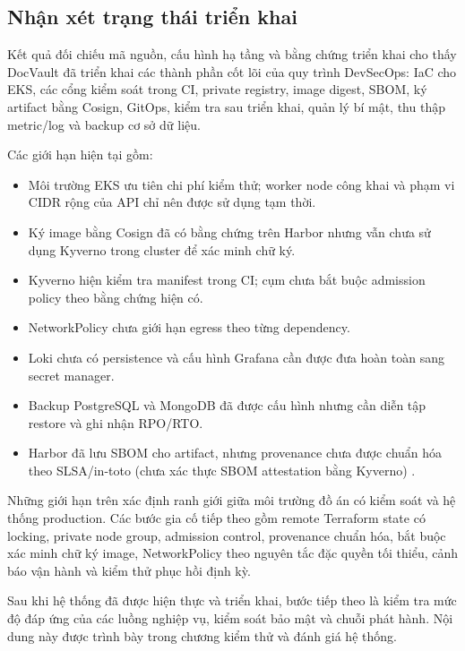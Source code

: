 \subsection{Nhận xét trạng thái triển khai}

Kết quả đối chiếu mã nguồn, cấu hình hạ tầng và bằng chứng triển khai cho thấy DocVault đã triển khai các thành phần cốt lõi của quy trình DevSecOps: IaC cho EKS, các cổng kiểm soát trong CI, private registry, image digest, SBOM, ký artifact bằng Cosign, GitOps, kiểm tra sau triển khai, quản lý bí mật, thu thập metric/log và backup cơ sở dữ liệu.

Các giới hạn hiện tại gồm:

\begin{itemize}
  \item Môi trường EKS ưu tiên chi phí kiểm thử; worker node công khai và phạm vi CIDR rộng của API chỉ nên được sử dụng tạm thời.
  \item Ký image bằng Cosign đã có bằng chứng trên Harbor nhưng vẫn chưa sử dụng Kyverno trong cluster để xác minh chữ ký.
  \item Kyverno hiện kiểm tra manifest trong CI; cụm chưa bắt buộc admission policy theo bằng chứng hiện có.
  \item NetworkPolicy chưa giới hạn egress theo từng dependency.
  \item Loki chưa có persistence và cấu hình Grafana cần được đưa hoàn toàn sang secret manager.
  \item Backup PostgreSQL và MongoDB đã được cấu hình nhưng cần diễn tập restore và ghi nhận RPO/RTO.
  \item Harbor đã lưu SBOM cho artifact, nhưng provenance chưa được chuẩn hóa theo SLSA/in-toto (chưa xác thực SBOM attestation bằng Kyverno) \cite{slsa_framework}.
\end{itemize}

Những giới hạn trên xác định ranh giới giữa môi trường đồ án có kiểm soát và hệ thống production. Các bước gia cố tiếp theo gồm remote Terraform state có locking, private node group, admission control, provenance chuẩn hóa, bắt buộc xác minh chữ ký image, NetworkPolicy theo nguyên tắc đặc quyền tối thiểu, cảnh báo vận hành và kiểm thử phục hồi định kỳ.

Sau khi hệ thống đã được hiện thực và triển khai, bước tiếp theo là kiểm tra mức độ đáp ứng của các luồng nghiệp vụ, kiểm soát bảo mật và chuỗi phát hành. Nội dung này được trình bày trong chương kiểm thử và đánh giá hệ thống.
